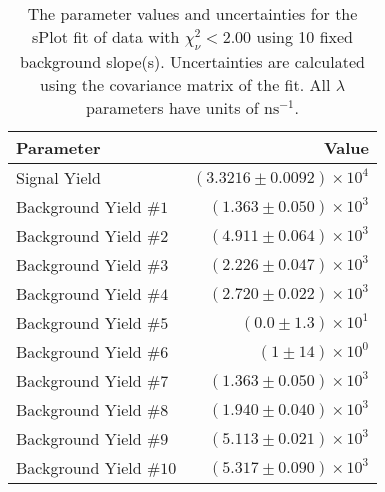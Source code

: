
\begin{table}
    \begin{center}
        \begin{tabular}{lr}\toprule
            Parameter & Value \\\midrule
            Signal Yield & $(3.3216 \pm 0.0092) \times 10^{4}$ \\
            Background Yield $\#1$ & $(1.363 \pm 0.050) \times 10^{3}$ \\
            Background Yield $\#2$ & $(4.911 \pm 0.064) \times 10^{3}$ \\
            Background Yield $\#3$ & $(2.226 \pm 0.047) \times 10^{3}$ \\
            Background Yield $\#4$ & $(2.720 \pm 0.022) \times 10^{3}$ \\
            Background Yield $\#5$ & $(0.0 \pm 1.3) \times 10^{1}$ \\
            Background Yield $\#6$ & $(1 \pm 14) \times 10^{0}$ \\
            Background Yield $\#7$ & $(1.363 \pm 0.050) \times 10^{3}$ \\
            Background Yield $\#8$ & $(1.940 \pm 0.040) \times 10^{3}$ \\
            Background Yield $\#9$ & $(5.113 \pm 0.021) \times 10^{3}$ \\
            Background Yield $\#10$ & $(5.317 \pm 0.090) \times 10^{3}$ \\\bottomrule
        \end{tabular}
        \caption{The parameter values and uncertainties for the sPlot fit of data with $\chi^2_\nu < 2.00$ using 10 fixed background slope(s). Uncertainties are calculated using the covariance matrix of the fit. All $\lambda$ parameters have units of $\si{\nano\second}^{-1}$.}
    \end{center}
\end{table}
